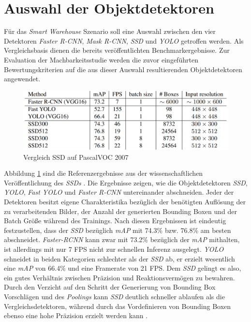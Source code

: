 \section{Auswahl der Objektdetektoren} \label{detect}

Für das \textit{Smart Warehouse} Szenario soll eine Auswahl zwischen den vier Detektoren \textit{Faster R-CNN}, \textit{Mask R-CNN}, \textit{SSD} und \textit{YOLO} getroffen werden. Als Vergleichsbasis dienen die bereits veröffentlichten Benchmarkergebnisse. Zur Evaluation der Machbarkeitsstudie werden die zuvor eingeführten Bewertungskriterien auf die aus dieser Auswahl resultierenden Objektdetektoren angewendet.

\begin{figure}[ht]
	\begin{center}
		\includegraphics[width=12cm]{Bilder/ssd_results.png} 
		\caption[Vergleich SSD auf PascalVOC 2007]{Vergleich SSD auf PascalVOC 2007\footnotemark \cite{ssd.20161229}}
		\label{result}
	\end{center}
\end{figure}

Abbildung \ref{result} sind die Referenzergebnisse aus der wissenschaftlichen Veröffentlichung des \textit{SSDs} \cite{ssd.20161229}. Die Ergebnisse zeigen, wie die Objektdetektoren \textit{SSD}, \textit{YOLO}, \textit{Fast YOLO} und \textit{Faster R-CNN} untereinander abschneiden. Jeder der Detektoren besitzt eigene Charakteristika bezüglich der benötigten Auflösung der zu verarbeitenden Bilder, der Anzahl der generierten Bounding Boxen und der Batch Größe während des Trainings. Nach diesen Ergebnissen ist eindeutig festzustellen, dass der \textit{SSD} bezüglich \textit{mAP} mit 74.3\% bzw. 76.8\% am besten abschneidet. \textit{Faster-RCNN} kann zwar mit 73.2\% bezüglich der \textit{mAP} mithalten, ist allerdings mit nur 7 FPS nicht zur schnellen Inferenz ausgelegt. \textit{YOLO} schneidet in beiden Kategorien schlechter als der \textit{SSD} ab, er erzielt wesentlich eine \textit{mAP} von 66.4\% und eine Framerate von 21 FPS. Dem \textit{SSD} gelingt es also, ein gutes Verhältnis zwischen Präzision und Reaktionsvermögen zu bewahren. Durch den Verzicht auf den Schritt der Generierung von Bounding Box Vorschlägen und des \textit{Poolings} kann \textit{SSD} deutlich schneller ablaufen als die Vergleichsdetektoren, während durch das Vordefinieren von Bounding Boxen ebenso eine hohe Präzision erzielt werden kann \cite{ssd.20161229}.

